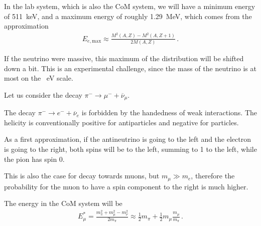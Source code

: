 \documentclass[main.tex]{subfiles}
\begin{document}
In the lab system, which is also the CoM system, we will have a minimum energy of \SI{511}{keV}, and a maximum energy of roughly \SI{1.29}{MeV}, which comes from the approximation 
%
\begin{align}
E _{e, \text{max}} \approx \frac{M^2(A, Z) - M^2 (A, Z+1)}{2 M(A, Z)}
\,.
\end{align}

If the neutrino were massive, this maximum of the distribution will be shifted down a bit.
This is an experimental challenge, since the mass of the neutrino is at most on the \SI{}{eV} scale. 

Let us consider the decay \(\pi^{-} \to \mu^{-} + \overline{\nu}_\mu \). 

The decay \(\pi^{-} \to e^{-} + \overline{\nu}_e\) is forbidden by the handedness of weak interactions. 
The helicity is conventionally positive for antiparticles and negative for particles. 

As a first approximation, if the antineutrino is going to the left and the electron is going to the right, both spins will be to the left, summing to 1 to the left, while the pion has spin 0. 

This is also the case for decay towards muons, but \(m_\mu \gg m_e\), therefore the probability for the muon to have a spin component to the right is much higher. 


The energy in the CoM system will be 
%
\begin{align}
E^{*}_\mu = \frac{m_\pi^2 + m^2_\mu - m_\nu^2}{2 m_\pi}
\approx \frac{1}{2} m_\pi + \frac{1}{2} m_\mu \frac{m_\mu }{m_\pi }
\,.
\end{align}
\end{document}
